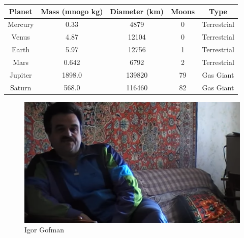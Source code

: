 \documentclass{article}
\begin{document}
\begin{tabular}{|c|c|c|c|c|}
\hline
Planet & Mass (mnogo kg) & Diameter (km) & Moons & Type \\
\hline
Mercury & 0.33 & 4879 & 0 & Terrestrial \\
\hline
Venus & 4.87 & 12104 & 0 & Terrestrial \\
\hline
Earth & 5.97 & 12756 & 1 & Terrestrial \\
\hline
Mars & 0.642 & 6792 & 2 & Terrestrial \\
\hline
Jupiter & 1898.0 & 139820 & 79 & Gas Giant \\
\hline
Saturn & 568.0 & 116460 & 82 & Gas Giant \\
\hline
\end{tabular}

\begin{figure}[htbp]
    \centering
    \includegraphics[width=\textwidth]{./images/gofman.jpeg}
    \caption{Igor Gofman}
\end{figure}
\end{document}
